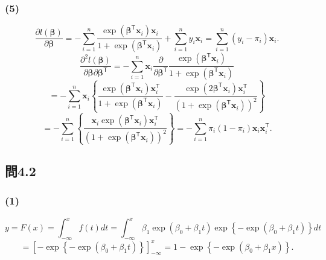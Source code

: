 \documentclass[pdflatex,ja=standard]{bxjsarticle}
\begin{document}
\subsubsection*{(5)}
\begin{equation}
    \frac{\partial l(\bm{\beta})}{\partial \bm{\beta}} = - \sum_{i=1}^{n} \frac{ \exp(\bm{\beta}^{\mathsf{T}} \bm{x}_i ) \bm{x}_i}{ 1 +  \exp (\bm{\beta}^{\mathsf{T}} \bm{x}_i )} + \sum_{i=1}^{n} y_i \bm{x}_i = \sum_{i=1}^{n} ( y_i - \pi_i ) \bm{x}_i.
\end{equation}
\begin{equation}
    \frac{\partial^2 l(\bm{\beta})}{\partial \bm{\beta} \partial \bm{\beta}^{\mathsf{T}}} = - \sum_{i=1}^{n} \bm{x}_i \frac{\partial}{\partial \bm{\beta}^{\mathsf{T}}} \frac{ \exp(\bm{\beta}^{\mathsf{T}} \bm{x}_i ) }{ 1 +  \exp (\bm{\beta}^{\mathsf{T}} \bm{x}_i )} 
\end{equation}
\begin{equation}
    = - \sum_{i=1}^{n} \bm{x}_i \left\{ \frac{ \exp(\bm{\beta}^{\mathsf{T}} \bm{x}_i ) \bm{x}_i^{\mathsf{T}} }{ 1 +  \exp (\bm{\beta}^{\mathsf{T}} \bm{x}_i )} -  \frac{ \exp(2\bm{\beta}^{\mathsf{T}} \bm{x}_i ) \bm{x}_i^{\mathsf{T}} }{ (1 +  \exp (\bm{\beta}^{\mathsf{T}} \bm{x}_i ))^2} \right\}
\end{equation}
\begin{equation}
    = - \sum_{i=1}^{n} \left\{ \frac{ \bm{x}_i  \exp(\bm{\beta}^{\mathsf{T}} \bm{x}_i ) \bm{x}_i^{\mathsf{T}} }{ (1 +  \exp (\bm{\beta}^{\mathsf{T}} \bm{x}_i ))^2} \right\}
    = - \sum_{i=1}^{n} \pi_i (1 - \pi_i) \bm{x}_{i} \bm{x}_{i}^{\mathsf{T}}.
\end{equation}

\subsection*{問4.2}
\subsubsection*{(1)}
\begin{equation}
    y = F(x) = \int_{-\infty}^{x} f(t) dt = \int_{-\infty}^{x} \beta_1 \exp(\beta_0 + \beta_1 t) \exp \left\{ - \exp (\beta_0 + \beta_1 t) \right\} dt
\end{equation}
\begin{equation}
    = \left[ - \exp \left\{ - \exp(\beta_0 + \beta_1 t) \right\} \right]_{- \infty}^{x}
    = 1 - \exp \left\{ - \exp (\beta_0 + \beta_1 x) \right\}.
\end{equation}
\end{document}
